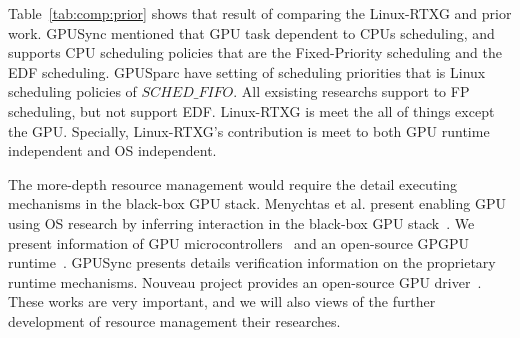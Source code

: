 Table~\ref{tab:comp:prior} shows that result of comparing the Linux-RTXG and prior work.
GPUSync mentioned that GPU task dependent to CPUs scheduling, and supports CPU scheduling policies that are the Fixed-Priority scheduling and the EDF scheduling.
GPUSparc have setting of scheduling priorities that is Linux scheduling policies of $SCHED\_FIFO$.
All exsisting researchs support to FP scheduling, but not support EDF.
Linux-RTXG is meet the all of things except the GPU.
Specially, Linux-RTXG's contribution is meet to both GPU runtime independent and OS independent.

The more-depth resource management would require the detail executing mechanisms in the black-box GPU stack.
Menychtas et al. present enabling GPU using OS research by inferring interaction in the black-box GPU stack~\cite{menychtas2013enabling}.
We present information of GPU microcontrollers~\cite{fujii:apsys2013} and an open-source GPGPU runtime~\cite{kato:gdev}.
GPUSync presents details verification information on the proprietary runtime mechanisms.
Nouveau project provides an open-source GPU driver~\cite{nouveau}.
These works are very important, and we will also views of the further development of resource management their researches.


